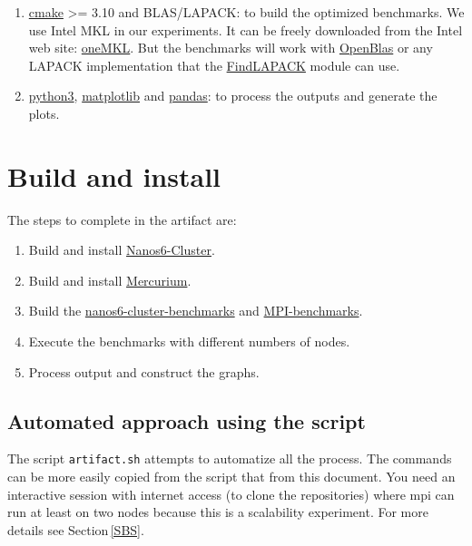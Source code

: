 \documentclass{article}
\newcommand{\code}[1]{\texttt{#1}}
\begin{document}
\begin{enumerate}
    \item \href{https://cmake.org/}{cmake} >= 3.10 and BLAS/LAPACK: to build
        the optimized benchmarks.  We use Intel MKL in our experiments.
        It can be freely downloaded from the Intel web site:
        \href{https://www.intel.com/content/www/us/en/developer/tools/oneapi/onemkl-download.html}{oneMKL}.
        But the benchmarks will work with \href{https://www.openblas.net/}{OpenBlas}
        or any LAPACK implementation that the
        \href{https://cmake.org/cmake/help/latest/module/FindLAPACK.html}{FindLAPACK}
        module can use.

    \item \href{https://www.python.org/downloads/}{python3},
        \href{https://matplotlib.org/}{matplotlib} and
        \href{https://pandas.pydata.org/}{pandas}: to process the outputs
        and generate the plots.

\end{enumerate}

\section{Build and install}

The steps to complete in the artifact are:

\begin{enumerate}
    \item Build and install \href{https://github.com/bsc-pm/nanos6-cluster}{Nanos6-Cluster}.
    \item Build and install \href{https://github.com/bsc-pm/mcxx}{Mercurium}.
    \item Build the \href{https://github.com/Ergus/nanos-cluster-benchmarks}{nanos6-cluster-benchmarks}
        and \href{https://github.com/Ergus/MPI_Benchmarks}{MPI-benchmarks}.
    \item Execute the benchmarks with different numbers of nodes.
    \item Process output and construct the graphs.
\end{enumerate}

\subsection{Automated approach using the script}

The script \code{artifact.sh} attempts to automatize all the process.
The commands can be more easily copied from the script that from this
document.  You need an interactive session with internet access (to
clone the repositories) where mpi can run at least on two nodes
because this is a scalability experiment.  For more details see
Section\,\ref{SBS}.
\end{document}

